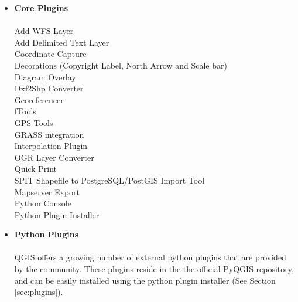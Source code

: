 \begin{itemize}
\item \textbf{Core Plugins}
\\ \\ Add WFS Layer
\\ Add Delimited Text Layer
\\ Coordinate Capture
\\ Decorations (Copyright Label, North Arrow and Scale bar)
\\ Diagram Overlay
\\ Dxf2Shp Converter
\\ Georeferencer
\\ fTools
\\ GPS Tools
\\ GRASS integration
\\ Interpolation Plugin
\\ OGR Layer Converter
\\ Quick Print
\\ SPIT Shapefile to PostgreSQL/PostGIS Import Tool
\\ Mapserver Export
\\ Python Console
\\ Python Plugin Installer
\\ \item \textbf{Python Plugins}
\\ \\ QGIS offers a growing number of external python plugins that are 
provided by the
community. These plugins reside in the the official
PyQGIS repository, and can be easily installed using the python plugin 
installer (See Section \ref{sec:plugins}).
\end{itemize}

